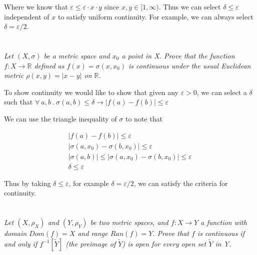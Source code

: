 \documentclass[]{article}
\newcommand{\reals}{\mathbb{R}}
\begin{document}
		Where we know that $\varepsilon \leq \varepsilon \cdot x \cdot y$ since $x, y \in [1, \infty)$. Thus we can select $\delta \leq \varepsilon$ independent of $x$ to satisfy uniform continuity. For example, we can always select $\delta = \varepsilon / 2$.

	\section{}
		\textit{Let $(X, \sigma)$ be a metric space and $x_0$ a point in X. Prove that the function $f : X \to \reals$ defined as $f(x) = \sigma(x, x_0)$ is continuous under the usual Euclidean metric $\rho(x, y) = |x - y|$ on $\reals$.}

		To show continuity we would like to show that given any $\varepsilon > 0$, we can select a $\delta$ such that $\forall\ a, b\ .\ \sigma(a, b) \leq \delta \to |f(a) - f(b)| \leq \varepsilon$

		We can use the triangle inequality of $\sigma$ to note that 

		\begin{align*}
			|f(a) - f(b)| \leq \varepsilon \\
			|\sigma(a, x_0) - \sigma(b, x_0)| \leq \varepsilon \\
			|\sigma(a, b)| \leq |\sigma(a, x_0) - \sigma(b, x_0)| \leq \varepsilon \\
			\delta \leq \varepsilon
		\end{align*}

		Thus by taking $\delta \leq \varepsilon$, for example $\delta = \varepsilon / 2$, we can satisfy the criteria for continuity. 

	\section{}
		\textit{Let $(X, \rho_X)$ and $(Y, \rho_Y)$ be two metric spaces, and $f : X \to Y$ a function with domain $Dom(f) = X$ and range $Ran(f) = Y$. Prove that $f$ is continuous if and only if $f^{-1}[\tilde{Y}]$ (the preimage of $\tilde{Y}$) is open for every open set $\tilde{Y}$ in Y.}



\end{document}
